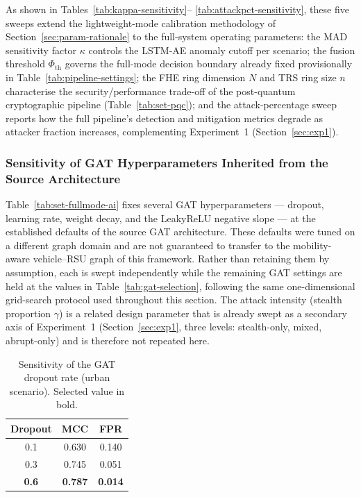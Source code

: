 \documentclass[12pt, a4paper]{report}
\begin{document}
As shown in Tables~\ref{tab:kappa-sensitivity}--%
\ref{tab:attackpct-sensitivity}, these five sweeps extend the
lightweight-mode calibration methodology of
Section~\ref{sec:param-rationale} to the full-system operating
parameters: the MAD sensitivity factor $\kappa$ controls the
LSTM-AE anomaly cutoff per scenario; the fusion threshold
$\Phi_{\mathrm{th}}$ governs the full-mode decision boundary
already fixed provisionally in
Table~\ref{tab:pipeline-settings}; the FHE ring dimension $N$
and TRS ring size $n$ characterise the security/performance
trade-off of the post-quantum cryptographic pipeline
(Table~\ref{tab:set-pqc}); and the attack-percentage sweep
reports how the full pipeline's detection and mitigation metrics
degrade as attacker fraction increases, complementing
Experiment~1 (Section~\ref{sec:exp1}).

\subsubsection{Sensitivity of GAT Hyperparameters Inherited from the Source Architecture}
\label{sec:gat-hparam-sensitivity}

Table~\ref{tab:set-fullmode-ai} fixes several GAT hyperparameters ---
dropout, learning rate, weight decay, and the LeakyReLU negative
slope --- at the established defaults of the source GAT
architecture. These defaults were tuned on a different graph
domain and are not guaranteed to transfer to the mobility-aware
vehicle--RSU graph of this framework. Rather than retaining them
by assumption, each is swept independently while the remaining
GAT settings are held at the values in
Table~\ref{tab:gat-selection}, following the same one-dimensional
grid-search protocol used throughout this section. The attack
intensity (stealth proportion $\gamma$) is a related design
parameter that is already swept as a secondary axis of
Experiment~1 (Section~\ref{sec:exp1}, three levels: stealth-only,
mixed, abrupt-only) and is therefore not repeated here.

\begin{table}[H]
\centering
\caption{Sensitivity of the GAT dropout rate (urban scenario).
Selected value in bold.}
\label{tab:gat-dropout-sensitivity}
\renewcommand{\arraystretch}{1.2}
\begin{tabular}{|c|c|c|}
\hline
\textbf{Dropout} & \textbf{MCC} & \textbf{FPR} \\
\hline
0.1           & 0.630 & 0.140 \\
\hline
0.3           & 0.745 & 0.051 \\
\hline
\textbf{0.6}  & \textbf{0.787} & \textbf{0.014} \\
\hline
\end{tabular}
\end{table}
\end{document}
